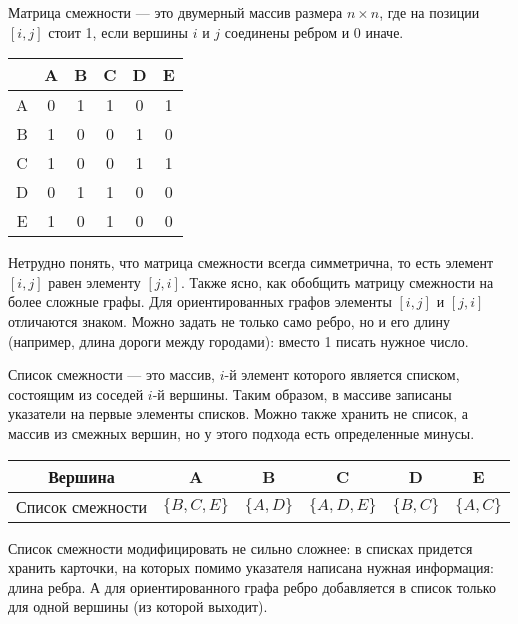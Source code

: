 Матрица смежности --- это двумерный массив размера $n \times n$, где на
позиции $[i, j]$ стоит 1, если вершины $i$ и $j$ соединены ребром и 0
иначе.

\begin{center}
    \begin{tabular}{c||c|c|c|c|c}
            & A & B & C & D & E \\
            \hline \hline
        A & 0 & 1 & 1 & 0 & 1 \\ \hline
        B & 1 & 0 & 0 & 1 & 0 \\ \hline
        C & 1 & 0 & 0 & 1 & 1 \\ \hline
        D & 0 & 1 & 1 & 0 & 0 \\ \hline
        E & 1 & 0 & 1 & 0 & 0
    \end{tabular}
\end{center}

Нетрудно понять, что матрица смежности всегда симметрична, то есть элемент
$[i, j]$ равен элементу $[j, i]$. Также ясно, как обобщить матрицу
смежности на более сложные графы. Для ориентированных графов элементы
$[i, j]$ и $[j, i]$ отличаются знаком. Можно задать не только само ребро,
но и его длину (например, длина дороги между городами): вместо 1 писать
нужное число. 

Список смежности --- это массив, $i$-й элемент которого является списком,
состоящим из соседей $i$-й вершины. Таким образом, в массиве записаны
указатели на первые элементы списков. Можно также хранить не список, а
массив из смежных вершин, но у этого подхода есть определенные минусы.

\begin{center}
    \begin{tabular}{c||c|c|c|c|c}
        Вершина & A & B & C & D & E \\ \hline
        Список смежности & $\{B, C, E\}$ & $\{A, D\}$ & $\{A, D, E\}$ & 
        $\{B, C\}$ & $\{A, C\}$
    \end{tabular}
\end{center}

Список смежности модифицировать не сильно сложнее: в списках придется хранить
карточки, на которых помимо указателя написана нужная информация: длина ребра.
А для ориентированного графа ребро добавляется в список только для одной
вершины (из которой выходит).

